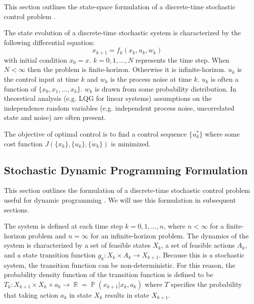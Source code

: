 \documentclass[conference]{IEEEtran}
\DeclareMathOperator*{\E}{\mathbb{E}}
\DeclareMathOperator*{\R}{\mathbb{R}}
\DeclareMathOperator*{\Prob}{\mathbb{P}}
\begin{document}
This section outlines the state-space formulation of a discrete-time stochastic control problem \cite{Rogers2010coursenotes,bertsekas1995dynamic}.

The state evolution of a discrete-time stochastic system is characterized by the following differential equation:
\begin{equation}
x_{k+1}=f_k(x_k,u_k,w_k)\label{stochastic_system}
\end{equation}
with initial condition $x_0 = x$. $k = 0,1,...,N$ represents the time step. When $N < \infty$ then the problem is finite-horizon. Otherwise it is infinite-horizon. $u_k$ is the control input at time $k$ and $w_k$ is the process noise at time $k$. $u_k$ is often a function of $\{x_0,x_1,...,x_k\}$. $w_k$ is drawn from some probability distribution. In theoretical analysis (e.g. LQG for linear systems) assumptions on the independence random variables (e.g. independent process noise, uncorrelated state and noise) are often present.

The objective of optimal control is to find a control sequence $\{u^*_k\}$ where some cost function $J(\{x_k\},\{u_k\},\{w_k\})$ is minimized.

\subsection{Stochastic Dynamic Programming Formulation}

This section outlines the formulation of a discrete-time stochastic control problem useful for dynamic programming \cite{ross2014introduction}. We will use this formulation in subsequent sections.

The system is defined at each time step $k = 0,1,...,n$, where $n < \infty$ for a finite-horizon problem and $n = \infty$ for an infinite-horizon problem. The dynamics of the system is characterized by a set of feasible states $X_k$, a set of feasible actions $A_k$, and a state transition function $g_k: X_k \times A_k \rightarrow X_{k+1}$. Because this is a stochastic system, the transition function can be non-deterministic. For this reason, the probability density function of the transition function is defined to be $T_k: X_{k+1} \times X_k \times a_k \rightarrow \R = \Prob(x_{k+1}|x_k,a_k)$ where $T$ specifies the probability that taking action $a_k$ in state $X_k$ results in state $X_{k+1}$.
\end{document}
